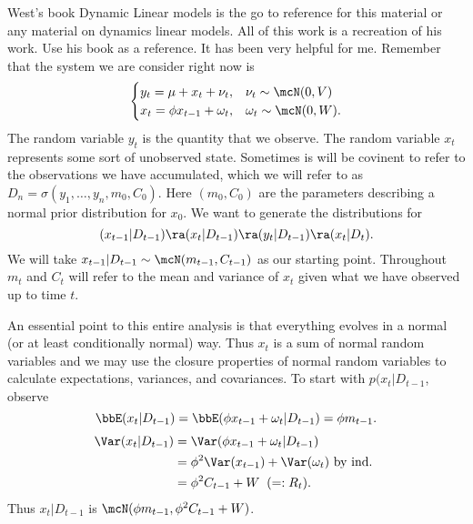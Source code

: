 \documentclass{article}
\begin{document}
West's book Dynamic Linear models is the go to reference for this material or any material on dynamics linear models.  All of this work is a recreation of his work.  Use his book as a reference.  It has been very helpful for me. 
Remember that the system we are consider right now is
\[
\begin{cases}
y_t = \mu + x_t + \nu_t, & \nu_t \sim \mcN(0, V) \\
x_t = \phi x_{t-1} + \omega_t, & \omega_t \sim \mcN(0, W).
\end{cases}
\]
The random variable $y_t$ is the quantity that we observe.  The random variable $x_t$ represents some sort of unobserved state.  Sometimes is will be covinent to refer to the observations we have accumulated, which we will refer to as $D_n = \sigma(y_1, \ldots, y_n, m_0, C_0)$.  Here $(m_0, C_0)$ are the parameters describing a normal prior distribution for $x_0$.
We want to generate the distributions for
\[
(x_{t-1} | D_{t-1}) \ra (x_t | D_{t-1}) \ra (y_t | D_{t-1}) \ra (x_t | D_t).
\]
We will take $x_{t-1} | D_{t-1} \sim \mcN(m_{t-1}, C_{t-1})$ as our starting point.  Throughout $m_t$ and $C_t$ will refer to the mean and variance of $x_t$ given what we have observed up to time $t$.

An essential point to this entire analysis is that everything evolves in a normal (or at least conditionally normal) way.  Thus $x_t$ is a sum of normal random variables and we may use the closure properties of normal random variables to calculate expectations, variances, and covariances.  To start with $p(x_t | D_{t-1}$, observe
\[
\bbE( x_t | D_{t-1}) = \bbE( \phi x_{t-1} + \omega_t | D_{t-1} ) = \phi m_{t-1}.
\]
\begin{align*}
\Var (x_t | D_{t-1}) 
& = \Var ( \phi x_{t-1} + \omega_t | D_{t-1} ) \\
& = \phi^2 \Var(x_{t-1}) + \Var(\omega_t) \textmd{ by ind. } \\
& = \phi^2 C_{t-1} + W \;\; (=: R_t).
\end{align*}
Thus $x_t | D_{t-1}$ is $\mcN(\phi m_{t-1}, \phi^2 C_{t-1} + W)$.
\end{document}
